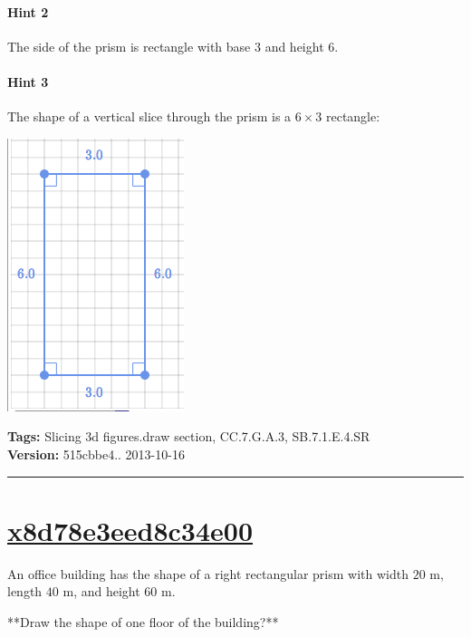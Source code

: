 \documentclass[twocolumn,10pt]{article}
\def\shrinkfactor{0.4}
\begin{document}
\paragraph{Hint 2}The side of the prism is rectangle with base $3$ and height $6$.

\paragraph{Hint 3}The shape of a vertical slice through the prism is a $6 \times 3$ rectangle:  

\includegraphics[scale=\shrinkfactor]{figures/8697a53b06e869ea09df9f318b41e82e0f50c94e.png}



\medskip
\noindent
\textbf{Tags:} {\footnotesize Slicing 3d figures.draw section, CC.7.G.A.3, SB.7.1.E.4.SR}\\
\textbf{Version:} 515cbbe4.. 2013-10-16
\smallskip\hrule





\section{\href{https://www.khanacademy.org/devadmin/content/items/x8d78e3eed8c34e00}{x8d78e3eed8c34e00}}

\noindent
An office building has the shape of a right rectangular prism with width $20\text{ m}$, length $40\text{ m}$, and height $60\text{ m}$.

**Draw the shape of one floor of the building?**
\end{document}
